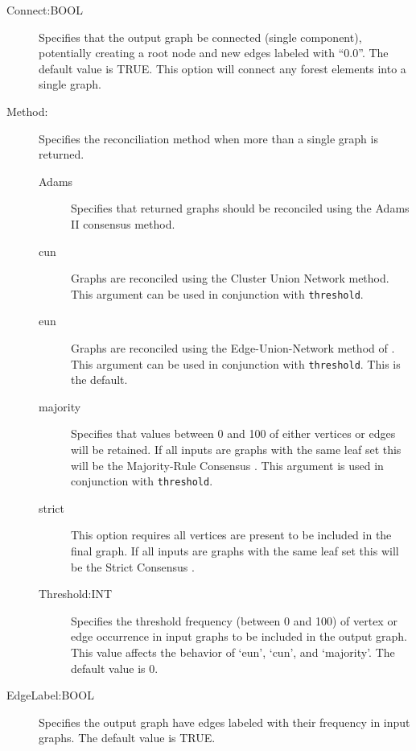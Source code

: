 \begin{description}
\begin{description}
			\item [Connect:BOOL] Specifies that the output graph be connected 
			(single component), potentially creating a root node and new edges labeled 
			with ``0.0''. The default value is TRUE. This option will connect any forest elements
			into a single graph. 
			
			\item [Method:] Specifies the reconciliation method when more than a single
			   graph is returned.
			
			\begin{description}
			
				\item[Adams] Specifies that returned graphs should be reconciled using the 
				Adams II consensus \citep{Adams1972} method.
				
				\item[cun] Graphs are reconciled using the Cluster Union Network 
				\citep{Baroni2005} method. This argument can be used in conjunction with 
				\texttt{threshold}. 
				
				\item[eun] Graphs are reconciled using the Edge-Union-Network method of 
				\citep{MiyagiandWheeler2019}. This argument can be used in conjunction with 
				\texttt{threshold}. This is the default.
				
				\item[majority] Specifies that values between 0 and 100 of either vertices or 
				edges will be retained. If all inputs are graphs with the same leaf set this will 
				be the Majority-Rule Consensus \citep{MargushandMcMorris1981}. This
				argument is used in conjunction with \texttt{threshold}.

				\item[strict] This option requires all vertices are present to be included in the final 
				graph. If all inputs are graphs with the same leaf set this will be the Strict Consensus 
				\citep{Schuhandpolhemus1980}. 
				
				\item [Threshold:INT] Specifies the threshold frequency (between 0 and 100) 
				of vertex or edge occurrence in input graphs to be included in the output graph. 
				This value affects the behavior of `eun', `cun', and `majority'. The 
				default value is $0$.
				
			\end{description}
		
			\item [EdgeLabel:BOOL] Specifies the output graph have edges 
			labeled with their frequency in input graphs. The default value is TRUE.			
			

\end{description}
\end{description}
